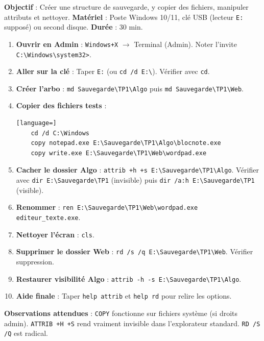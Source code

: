 \documentclass[11pt]{article}
\begin{document}
\begin{experience}
\textbf{Objectif} : Créer une structure de sauvegarde, y copier des fichiers, manipuler attributs et nettoyer.
\textbf{Matériel} : Poste Windows 10/11, clé USB (lecteur \texttt{E:} supposé) ou second disque.
\textbf{Durée} : 30 min.

\begin{enumerate}
    \item \textbf{Ouvrir en Admin} : \texttt{Windows+X} $\rightarrow$ Terminal (Admin). Noter l'invite \texttt{C:\textbackslash Windows\textbackslash system32>}.
    \item \textbf{Aller sur la clé} : Taper \texttt{E:} (ou \texttt{cd /d E:\textbackslash}). Vérifier avec \texttt{cd}.
    \item \textbf{Créer l'arbo} : \texttt{md Sauvegarde\textbackslash TP1\textbackslash Algo} puis \texttt{md Sauvegarde\textbackslash TP1\textbackslash Web}.
    \item \textbf{Copier des fichiers tests} : 
    \begin{lstlisting}[language=]
    cd /d C:\Windows
    copy notepad.exe E:\Sauvegarde\TP1\Algo\blocnote.exe
    copy write.exe E:\Sauvegarde\TP1\Web\wordpad.exe
    \end{lstlisting}
    \item \textbf{Cacher le dossier Algo} : \texttt{attrib +h +s E:\textbackslash Sauvegarde\textbackslash TP1\textbackslash Algo}. Vérifier avec \texttt{dir E:\textbackslash Sauvegarde\textbackslash TP1} (invisible) puis \texttt{dir /a:h E:\textbackslash Sauvegarde\textbackslash TP1} (visible).
    \item \textbf{Renommer} : \texttt{ren E:\textbackslash Sauvegarde\textbackslash TP1\textbackslash Web\textbackslash wordpad.exe editeur\_texte.exe}.
    \item \textbf{Nettoyer l'écran} : \texttt{cls}.
    \item \textbf{Supprimer le dossier Web} : \texttt{rd /s /q E:\textbackslash Sauvegarde\textbackslash TP1\textbackslash Web}. Vérifier suppression.
    \item \textbf{Restaurer visibilité Algo} : \texttt{attrib -h -s E:\textbackslash Sauvegarde\textbackslash TP1\textbackslash Algo}.
    \item \textbf{Aide finale} : Taper \texttt{help attrib} et \texttt{help rd} pour relire les options.
\end{enumerate}
\textbf{Observations attendues} : \texttt{COPY} fonctionne sur fichiers système (si droits admin). \texttt{ATTRIB +H +S} rend vraiment invisible dans l'explorateur standard. \texttt{RD /S /Q} est radical.
\end{experience}
\end{document}
